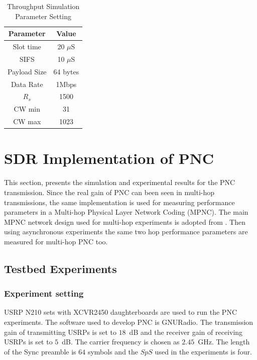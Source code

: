 \begin{table}
\caption{Throughput Simulation Parameter Setting}
\label{table:throughput}
\centering
\begin{tabular}{|c||c|}
\hline
Parameter & Value \\  
\hline
 Slot time & 20 $\mu$S \\ 
 \hline
 SIFS & 10 $\mu$S \\
 \hline
 Payload Size & 64 bytes\\ 
\hline
Data Rate & 1Mbps \\
\hline
$R_s$ & 1500 \\
\hline 
CW min & 31 \\
\hline
CW max & 1023 \\
\hline 
\end{tabular}
\end{table}




\section{SDR Implementation of PNC}
This section, presents the simulation and experimental results for the PNC transmission. Since the real gain of PNC can been seen in multi-hop transmissions, the same implementation is used for measuring performance parameters in a Multi-hop Physical Layer Network Coding (MPNC). The main MPNC network design used for multi-hop experiments is adopted from \cite{zhang2017cross}. Then using asynchronous experiments the same two hop performance parameters are measured for multi-hop PNC too. 

\subsection{Testbed Experiments}

\subsubsection{Experiment setting}
USRP N210 sets with XCVR2450 daughterboards are used to run the PNC experiments. The software used to develop PNC is GNURadio. The transmission gain of transmitting USRPs is set to $18$~dB and the receiver gain of receiving USRPs is set  to $5$~dB. %
The carrier frequency is chosen as $2.45$~GHz. The length of the Sync preamble is $64$ symbols and the $SpS$ used in the experiments is four. 


